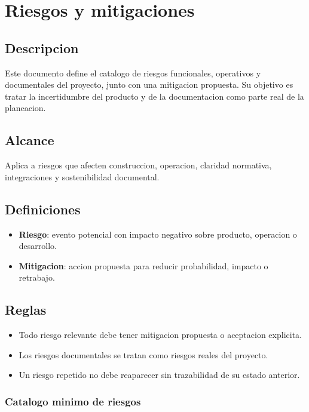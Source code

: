 \section{Riesgos y mitigaciones}

\subsection{Descripcion}

Este documento define el catalogo de riesgos funcionales, operativos y documentales del proyecto, junto con una mitigacion propuesta. Su objetivo es tratar la incertidumbre del producto y de la documentacion como parte real de la planeacion.

\subsection{Alcance}

Aplica a riesgos que afecten construccion, operacion, claridad normativa, integraciones y sostenibilidad documental.

\subsection{Definiciones}

\begin{itemize}
  \item \textbf{Riesgo}: evento potencial con impacto negativo sobre producto, operacion o desarrollo.
  \item \textbf{Mitigacion}: accion propuesta para reducir probabilidad, impacto o retrabajo.
\end{itemize}

\subsection{Reglas}

\begin{itemize}
  \item Todo riesgo relevante debe tener mitigacion propuesta o aceptacion explicita.
  \item Los riesgos documentales se tratan como riesgos reales del proyecto.
  \item Un riesgo repetido no debe reaparecer sin trazabilidad de su estado anterior.
\end{itemize}

\subsubsection{Catalogo minimo de riesgos}

